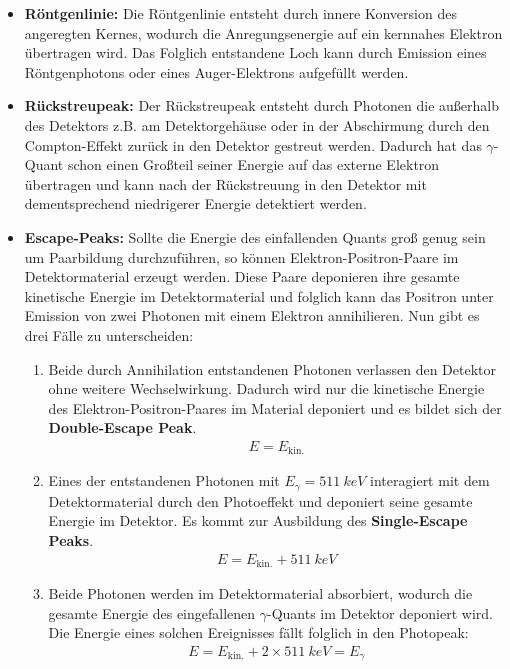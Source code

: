 \documentclass[11pt, a4paper]{article}
\numberwithin{equation}{section}
\begin{document}
\begin{itemize}
	\item \textbf{Röntgenlinie:}
	Die Röntgenlinie entsteht durch innere Konversion des angeregten Kernes, wodurch die Anregungsenergie auf ein kernnahes Elektron übertragen wird.
	Das Folglich entstandene Loch kann durch Emission eines Röntgenphotons oder eines Auger-Elektrons aufgefüllt werden.
	
	\item \textbf{Rückstreupeak:}
	Der Rückstreupeak entsteht durch Photonen die außerhalb des Detektors z.B. am Detektorgehäuse oder in der Abschirmung durch den Compton-Effekt zurück in den Detektor gestreut werden.
	Dadurch hat das $\gamma$-Quant schon einen Großteil seiner Energie auf das externe Elektron übertragen und kann nach der Rückstreuung in den Detektor mit dementsprechend niedrigerer Energie detektiert werden.
	
	\item \textbf{Escape-Peaks:}
	Sollte die Energie des einfallenden Quants groß genug sein um Paarbildung durchzuführen, so können Elektron-Positron-Paare im Detektormaterial erzeugt werden.
	Diese Paare deponieren ihre gesamte kinetische Energie im Detektormaterial und folglich kann das Positron unter Emission von zwei Photonen mit einem Elektron annihilieren.
	Nun gibt es drei Fälle zu unterscheiden:
	\begin{enumerate}
		\item Beide durch Annihilation entstandenen Photonen verlassen den Detektor ohne weitere Wechselwirkung.
		Dadurch wird nur die kinetische Energie des Elektron-Positron-Paares im Material deponiert und es bildet sich der \textbf{Double-Escape Peak}.
		\begin{align*}
			E = E_\mathrm{kin.}
		\end{align*}
		
		\item Eines der entstandenen Photonen mit $E_\gamma = \SI{511}{keV}$ interagiert mit dem Detektormaterial durch den Photoeffekt und deponiert seine gesamte Energie im Detektor.
		Es kommt zur Ausbildung des \textbf{Single-Escape Peaks}.
		\begin{align*}
			E = E_\mathrm{kin.} + \SI{511}{keV}
		\end{align*}
		
		\item Beide Photonen werden im Detektormaterial absorbiert, wodurch die gesamte Energie des eingefallenen $\gamma$-Quants im Detektor deponiert wird.
		Die Energie eines solchen Ereignisses fällt folglich in den Photopeak:
		\begin{align*}
			E = E_\mathrm{kin.} + 2 \times \SI{511}{keV} = E_\gamma
		\end{align*}
	\end{enumerate}
	

\end{itemize}
\end{document}
